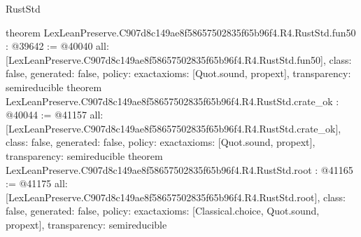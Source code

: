 \begin{lexlean}{RustStd}
\begin{coremodule}
{}
theorem LexLeanPreserve.C907d8c149ae8f58657502835f65b96f4.R4.RustStd.fun50 : @39642 := @40040 {
  all: [LexLeanPreserve.C907d8c149ae8f58657502835f65b96f4.R4.RustStd.fun50],
  class: false,
  generated: false,
  policy: exact{axioms: [Quot.sound, propext]},
  transparency: semireducible
}
theorem LexLeanPreserve.C907d8c149ae8f58657502835f65b96f4.R4.RustStd.crate_ok : @40044 := @41157 {
  all: [LexLeanPreserve.C907d8c149ae8f58657502835f65b96f4.R4.RustStd.crate_ok],
  class: false,
  generated: false,
  policy: exact{axioms: [Quot.sound, propext]},
  transparency: semireducible
}
theorem LexLeanPreserve.C907d8c149ae8f58657502835f65b96f4.R4.RustStd.root : @41165 := @41175 {
  all: [LexLeanPreserve.C907d8c149ae8f58657502835f65b96f4.R4.RustStd.root],
  class: false,
  generated: false,
  policy: exact{axioms: [Classical.choice, Quot.sound, propext]},
  transparency: semireducible
}


\end{coremodule}
\end{lexlean}
